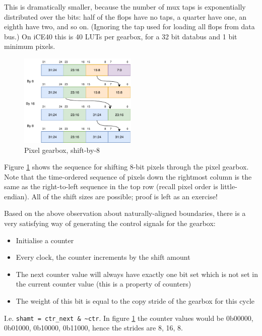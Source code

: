 This is dramatically smaller, because the number of mux taps is exponentially distributed over the bits: half of the flops have no taps, a quarter have one, an eighth have two, and so on. (Ignoring the tap used for loading all flops from data bus.) On iCE40 this is 40 LUTs per gearbox, for a 32 bit databus and 1 bit minimum pixels.

\begin{figure}[H]
\centering
\caption{Pixel gearbox, shift-by-8}
\label{diagram:pixel_gearbox_8}
\includegraphics[width=0.5\textwidth]{diagrams/pixel_gearbox_8.pdf}
\end{figure}

Figure \ref{diagram:pixel_gearbox_8} shows the sequence for shifting 8-bit pixels through the pixel gearbox. Note that the time-ordered sequence of pixels down the rightmost column is the same as the right-to-left sequence in the top row (recall pixel order is little-endian). All of the shift sizes are possible; proof is left as an exercise!

Based on the above observation about naturally-aligned boundaries, there is a very satisfying way of generating the control signals for the gearbox:

\begin{itemize}
	\item Initialise a counter
	\item Every clock, the counter increments by the shift amount
	\item The next counter value will always have exactly one bit set which is not set in the current counter value (this is a property of counters)
	\item The weight of this bit is equal to the copy stride of the gearbox for this cycle
\end{itemize}

I.e. \verb|shamt = ctr_next & ~ctr|. In figure \ref{diagram:pixel_gearbox_8} the counter values would be 0b00000, 0b01000, 0b10000, 0b11000, hence the strides are 8, 16, 8.

